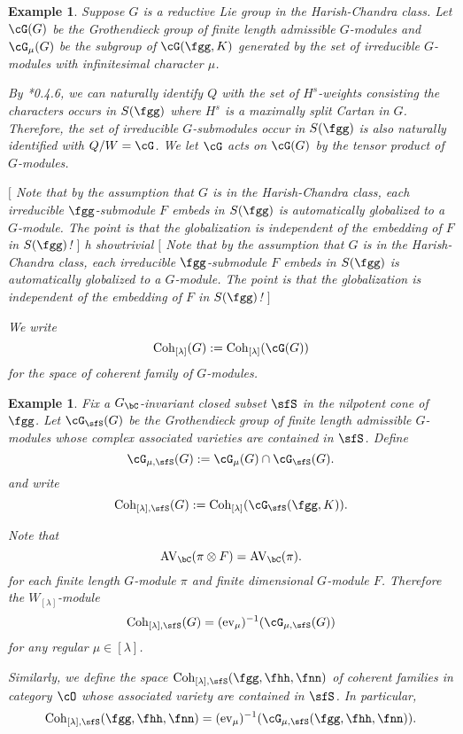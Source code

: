 \documentclass[12pt,a4paper]{amsart}
\newcommand{\trivial}[2][]{\if\relax\detokenize{#1}\relax
  {%
      \color{orange} \vspace{0em} $[$  #2 $]$
      \color{black}
  }
  \else
\ifx#1h
\ifcsname showtrivial\endcsname
{%
    \color{orange} \vspace{0em}  $[$ #2 $]$
    \color{black}
}
\fi
\else {\red Wrong argument!} \fi
\fi
}
\newcommand{\AVC}{\mathrm{AV}_\bC}
\numberwithin{equation}{section}
\newtheorem{eg}[thm]{Example}
\theoremstyle{remark}
\def\Gc{G_\bC}
\def\WLam{W_{\Lambda}}
\def\Coh{\mathrm{Coh}}
\def\ev#1{{\mathrm{ev}_{#1}}}
\begin{document}
\begin{eg}\label{eg:Coh.HC}
  Suppose $G$ is a reductive Lie group in the Harish-Chandra class. Let
  $\Grt(G)$ be the Grothendieck group of finite length admissible $G$-modules
  and $\Grt_{\mu}(G)$ be the subgroup of $\Grt(\fgg,K)$ generated by the set of
  irreducible $G$-modules with infinitesimal character $\mu$.

  By \cite{Vg}*{0.4.6}, we can naturally identify $Q$ with the set of
  $H^{s}$-weights consisting the characters occurs in $S(\fgg)$ where $H^{s}$ is
  a maximally split Cartan in $G$. Therefore, the set of irreducible
  $G$-submodules occur in $S(\fgg)$ is also naturally identified with $Q/W=\cG$.
  We let $\cG$ acts on $\Grt(G)$ by the tensor product of $G$-modules.

  \trivial[]{ Note that by the assumption that $G$ is in the Harish-Chandra
    class, each irreducible $\fgg$-submodule $F$ embeds in $S(\fgg)$ is
    automatically globalized to a $G$-module. The point is that the
    globalization is independent of the embedding of $F$ in $S(\fgg)$! }

  We write
  \[
    \Coh_{[\lambda]}(G) := \Coh_{[\lambda]}(\Grt(G))
  \]
  for the space of coherent family of $G$-modules.
\end{eg}

\begin{eg}
  Fix a $\Gc$-invariant closed subset $\sfS$ in the nilpotent cone of $\fgg$.
  Let $\Grt_{\sfS}(G)$ be the Grothendieck group of finite length admissible
  $G$-modules whose complex associated varieties are contained in $\sfS$. Define
  \[
    \Grt_{\mu,\sfS}(G) := \Grt_{\mu}(G)\cap \Grt_{\sfS}(G).
  \]
  and write
  \[
    \Coh_{[\lambda],\sfS}(G):= \Coh_{[\lambda]}(\Grt_{\sfS}(\fgg,K)).
  \]

  Note that
  \[
    \AVC(\pi\otimes F) = \AVC(\pi).
  \]
  for each finite length $G$-module $\pi$ and finite dimensional $G$-module $F$.
  Therefore the $W_{[\lambda]}$-module
  \[
    \Coh_{[\lambda],\sfS}(G) = (\ev{\mu})^{-1}(\Grt_{\mu,\sfS}(G))
  \]
  for any regular $\mu\in [\lambda]$.

  Similarly, we define the space $\Coh_{[\lambda],\sfS}(\fgg,\fhh,\fnn)$ of
  coherent families in category $\cO$ whose associated variety are contained in
  $\sfS$. In particular,
  \[
    \Coh_{[\lambda],\sfS}(\fgg,\fhh,\fnn) = (\ev{\mu})^{-1}(\Grt_{\mu,\sfS}(\fgg,\fhh,\fnn)).
  \]
\end{eg}
\end{document}
